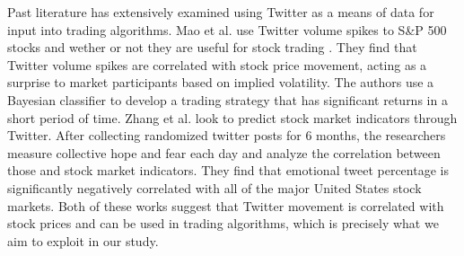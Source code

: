 \documentclass[../thesis.tex]{subfiles}
\begin{document}
Past literature has extensively examined using Twitter as a means of data for input into trading algorithms. Mao et al. \cite{Mao2013} use Twitter volume spikes to S\&P 500 stocks and wether or not they are useful for stock trading . They find that Twitter volume spikes are correlated with stock price movement, acting as a surprise to market participants based on implied volatility. The authors use a Bayesian classifier to develop a trading strategy that has significant returns in a short period of time. Zhang et al. \cite{Zhang2011} look to predict stock market indicators through Twitter. After collecting randomized twitter posts for 6 months, the researchers measure collective hope and fear each day and analyze the correlation between those and stock market indicators. They find that emotional tweet percentage is significantly negatively correlated with all of the major United States stock markets. Both of these works suggest that Twitter movement is correlated with stock prices and can be used in trading algorithms, which is precisely what we aim to exploit in our study. 
\end{document}
